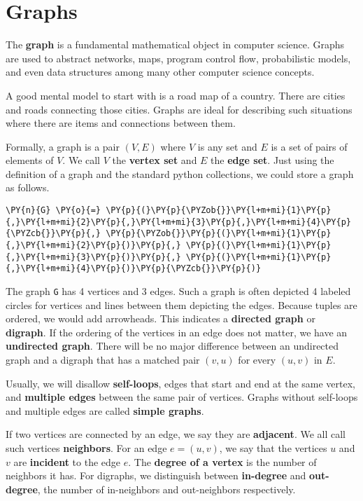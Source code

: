 \chapter{Graphs}


The \textbf{graph} is a fundamental mathematical object in computer science.  Graphs are used to abstract networks, maps, program control flow, probabilistic models, and even data structures among many other computer science concepts.


A good mental model to start with is a road map of a country.  There are cities and roads connecting those cities.  Graphs are ideal for describing such situations where there are items and connections between them.


Formally, a graph is a pair $(V, E)$ where $V$ is any set and $E$ is a set of pairs of elements of $V$.  We call $V$ the \textbf{vertex set} and $E$ the \textbf{edge set}.  Just using the definition of a graph and the standard python collections, we could store a graph as follows.

\begin{Verbatim}[commandchars=\\\{\}]
\PY{n}{G} \PY{o}{=} \PY{p}{(}\PY{p}{\PYZob{}}\PY{l+m+mi}{1}\PY{p}{,}\PY{l+m+mi}{2}\PY{p}{,}\PY{l+m+mi}{3}\PY{p}{,}\PY{l+m+mi}{4}\PY{p}{\PYZcb{}}\PY{p}{,} \PY{p}{\PYZob{}}\PY{p}{(}\PY{l+m+mi}{1}\PY{p}{,}\PY{l+m+mi}{2}\PY{p}{)}\PY{p}{,} \PY{p}{(}\PY{l+m+mi}{1}\PY{p}{,}\PY{l+m+mi}{3}\PY{p}{)}\PY{p}{,} \PY{p}{(}\PY{l+m+mi}{1}\PY{p}{,}\PY{l+m+mi}{4}\PY{p}{)}\PY{p}{\PYZcb{}}\PY{p}{)}
\end{Verbatim}



The graph \texttt{G} has 4 vertices and 3 edges.  Such a graph is often depicted 4 labeled circles for vertices and lines between them depicting the edges.  Because tuples are ordered, we would add arrowheads.  This indicates a \textbf{directed graph} or \textbf{digraph}.  If the ordering of the vertices in an edge does not matter, we have an \textbf{undirected graph}.  There will be no major difference between an undirected graph and a digraph that has a matched pair $(v,u)$ for every $(u,v)$ in $E$.


Usually, we will disallow \textbf{self-loops}, edges that start and end at the same vertex, and \textbf{multiple edges} between the same pair of vertices.  Graphs without self-loops and multiple edges are called \textbf{simple graphs}.


If two vertices are connected by an edge, we say they are \textbf{adjacent}.
We all call such vertices \textbf{neighbors}.
For an edge $e = (u,v)$, we say that the vertices $u$ and $v$ are \textbf{incident} to the edge $e$.  The \textbf{degree of a vertex} is the number of neighbors it has.  For digraphs, we distinguish between \textbf{in-degree} and \textbf{out-degree}, the number of in-neighbors and out-neighbors respectively.

